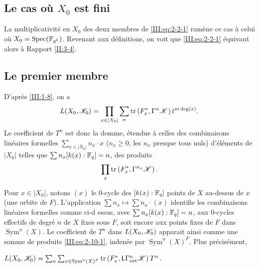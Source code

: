 \subsection{Le cas où $X_0$ est fini}\label{III:2-9}

La multiplicativité en $X_0$ des deux membres de \eqref{III:eq:2-2-1} 
ramène ce cas à celui où $X_0=\operatorname{Spec}(\mathbb{F}_{q^k})$. Revenant aux 
définitions, on voit que \eqref{III:eq:2-2-1} équivaut alors à 
Rapport \ref{II:3-4}. 





\subsection{Le premier membre}\label{III:2-10}

D'après \ref{III:1-8}, on a 
\[
  L(X_0,\mathscr{K}_0) = \prod_{x\in |X_0|} \sum_n \operatorname{tr}\left(F_x^*,\Gamma^n\mathscr{K}\right) t^{m\deg(x)} \text{.}
\]
Le coefficient de $T^n$ est donc la domme, étendue à celles des 
combinaisons linéaires formelles $\sum_{x\in |X_0|} n_x\cdot x$ 
($n_x\geqslant 0$, les $n_x$ presque tous nuls) d'éléments de $|X_0|$ 
telles que $\sum n_x [k(x):\mathbb{F}_q] = n$, des produits 
\begin{equation}\label{III:eq:2-10-1}
  \prod_x \operatorname{tr}\left(F_x^*,\Gamma^{n_x} \mathscr{K}\right) \text{.}
\end{equation}

Pour $x\in |X_0|$, notons $(x)$ le $0$-cycle des $[k(x):\mathbb{F}_q]$ points de $X$ 
au-dessus de $x$ (une orbite de $F$). L'application 
$\sum n_x\mapsto \sum n_x\cdot (x)$ identifie les combinaisons linéaires 
formelles comme ci-d
essus, avec $\sum n_x [k(x):\mathbb{F}_q]=n$, aux $0$-cycles effectifs de degré $n$ 
de $X$ fixes sous $F$, soit encore aux points fixes de $F$ dans 
$\operatorname{Sym}^n(X)$. Le coefficient de $T^n$ dans $L(X_0,\mathscr{K}_0)$ 
apparait ainsi comme une somme de produits \eqref{III:eq:2-10-1}, indenée 
par $\operatorname{Sym}^n(X)^F$. Plus précisément, 





\begin{lemma_}\label{III:2-11}
 $L(X_0,\mathscr{K}_0) = \sum_n \sum_{x\in\operatorname{Sym}^n(X)^F} \operatorname{tr}\left(F_x^*,\mathsf{L}\Gamma_\textnormal{ext}^n \mathscr{K}\right) T^n$.
\end{lemma_}

